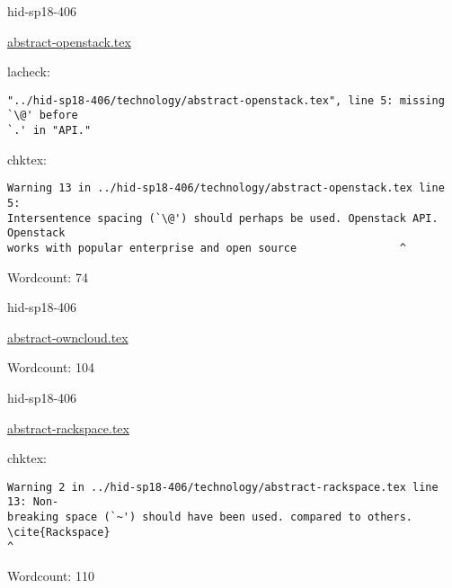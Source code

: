\begin{IU}

hid-sp18-406

\href{https://github.com/cloudmesh-community/hid-sp18-406/blob/master//technology/abstract-openstack.tex}{abstract-openstack.tex}

 
lacheck:
\begin{tiny}
\begin{verbatim}
"../hid-sp18-406/technology/abstract-openstack.tex", line 5: missing `\@' before
`.' in "API."
\end{verbatim}
\end{tiny}
chktex:
\begin{tiny}
\begin{verbatim}
Warning 13 in ../hid-sp18-406/technology/abstract-openstack.tex line 5:
Intersentence spacing (`\@') should perhaps be used. Openstack API. Openstack
works with popular enterprise and open source                ^
\end{verbatim}
\end{tiny}

Wordcount: 74

\end{IU}



\begin{IU}

hid-sp18-406

\href{https://github.com/cloudmesh-community/hid-sp18-406/blob/master//technology/abstract-owncloud.tex}{abstract-owncloud.tex}

 

Wordcount: 104

\end{IU}



\begin{IU}

hid-sp18-406

\href{https://github.com/cloudmesh-community/hid-sp18-406/blob/master//technology/abstract-rackspace.tex}{abstract-rackspace.tex}

 
chktex:
\begin{tiny}
\begin{verbatim}
Warning 2 in ../hid-sp18-406/technology/abstract-rackspace.tex line 13: Non-
breaking space (`~') should have been used. compared to others. \cite{Rackspace}
^
\end{verbatim}
\end{tiny}

Wordcount: 110

\end{IU}

